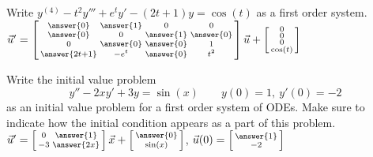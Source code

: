 \documentclass{ximera}
\begin{document}
\begin{exercise}
    Write $y^{(4)} - t^2 y''' + e^t y' - (2t+1)y = \cos(t)$ as a first order system.\\
    $\vec{u}' = \left[\begin{smallmatrix}  \answer{0} & \answer{1} & 0 & 0 \\ \answer{0} & 0 & \answer{1} & \answer{0} \\ 0 & \answer{0} & \answer{0} & 1 \\ \answer{2t+1} & -e^t & \answer{0} & t^2 \end{smallmatrix}\right]\vec{u} + \left[\begin{smallmatrix} 0 \\ 0 \\ 0 \\ \cos(t) \end{smallmatrix}\right]$
\end{exercise}

\begin{exercise}
    Write the initial value problem 
    \[ 
        y'' - 2xy' + 3y = \sin(x) \qquad y(0) = 1,\ y'(0) = -2 
    \] 
    as an initial value problem for a first order system of ODEs. Make sure to indicate how the initial condition appears as a part of this problem. \\
    $\vec{u}' = \left[\begin{smallmatrix}  0 & \answer{1} \\ -3 & \answer{2x} \end{smallmatrix}\right]\vec{x} + \left[\begin{smallmatrix}  \answer{0} \\ \sin(x) \end{smallmatrix}\right]$, $\vec{u}(0) = \left[\begin{smallmatrix}  \answer{1} \\ -2 \end{smallmatrix}\right]$
\end{exercise}
\end{document}

